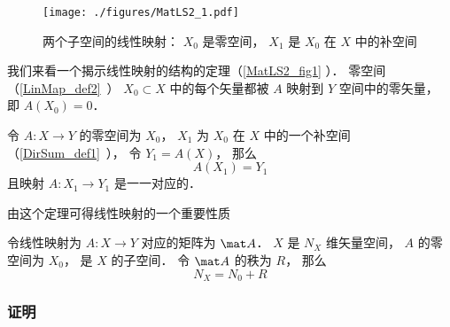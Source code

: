 

\begin{figure}[ht]
\centering
\texttt{[image: ./figures/MatLS2\_1.pdf]}
\caption{两个子空间的线性映射： $X_0$ 是零空间， $X_1$ 是 $X_0$ 在 $X$ 中的补空间} \label{MatLS2_fig1}
\end{figure}
我们来看一个揭示线性映射的结构的定理（\autoref{MatLS2_fig1} ）． 零空间（\autoref{LinMap_def2}~） $X_0 \subset X$ 中的每个矢量都被 $A$ 映射到 $Y$ 空间中的零矢量， 即 $A(X_0) = \qty{0}$．
\begin{theorem}{}
令 $A:X \to Y$ 的零空间为 $X_0$， $X_1$ 为 $X_0$ 在 $X$ 中的一个补空间（\autoref{DirSum_def1}~）， 令 $Y_1 = A(X)$， 那么
\begin{equation}
A(X_1) = Y_1
\end{equation}
且映射 $A:X_1\to Y_1$ 是一一对应的．
\end{theorem}
由这个定理可得线性映射的一个重要性质
\begin{corollary}{}
令线性映射为 $A:X\to Y$ 对应的矩阵为 $\mat A$． $X$ 是 $N_X$ 维矢量空间， $A$ 的零空间为 $X_0$， 是 $X$ 的子空间． 令 $\mat A$ 的秩为 $R$， 那么
\begin{equation}
N_X = N_0 + R
\end{equation}
\end{corollary}


\subsubsection{证明}
